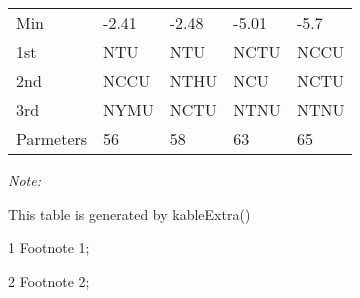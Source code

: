 \begin{table}
\begin{threeparttable}
\begin{tabular}[t]{lllll}
\hspace{1em}Min & -2.41 & -2.48 & -5.01 & -5.7\\
\hspace{1em}1st & NTU & NTU & NCTU & NCCU\\
\hspace{1em}2nd & NCCU & NTHU & NCU & NCTU\\
\hspace{1em}3rd & NYMU & NCTU & NTNU & NTNU\\
Parmeters & 56 & 58 & 63 & 65\\
\bottomrule
\end{tabular}
\begin{tablenotes}
\item \textit{Note: } 
\item This table is generated by kableExtra()
\item[1] Footnote 1; 
\item[2] Footnote 2; 
\end{tablenotes}
\end{threeparttable}
\end{table}

